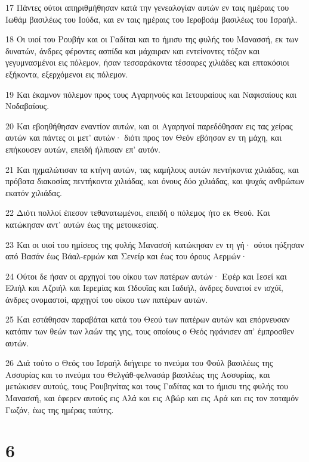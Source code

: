 \par 17 Πάντες ούτοι απηριθμήθησαν κατά την γενεαλογίαν αυτών εν ταις ημέραις του Ιωθάμ βασιλέως του Ιούδα, και εν ταις ημέραις του Ιεροβοάμ βασιλέως του Ισραήλ.
\par 18 Οι υιοί του Ρουβήν και οι Γαδίται και το ήμισυ της φυλής του Μανασσή, εκ των δυνατών, άνδρες φέροντες ασπίδα και μάχαιραν και εντείνοντες τόξον και γεγυμνασμένοι εις πόλεμον, ήσαν τεσσαράκοντα τέσσαρες χιλιάδες και επτακόσιοι εξήκοντα, εξερχόμενοι εις πόλεμον.
\par 19 Και έκαμνον πόλεμον προς τους Αγαρηνούς και Ιετουραίους και Ναφισαίους και Νοδαβαίους.
\par 20 Και εβοηθήθησαν εναντίον αυτών, και οι Αγαρηνοί παρεδόθησαν εις τας χείρας αυτών και πάντες οι μετ' αυτών· διότι προς τον Θεόν εβόησαν εν τη μάχη, και επήκουσεν αυτών, επειδή ήλπισαν επ' αυτόν.
\par 21 Και ηχμαλώτισαν τα κτήνη αυτών, τας καμήλους αυτών πεντήκοντα χιλιάδας, και πρόβατα διακοσίας πεντήκοντα χιλιάδας, και όνους δύο χιλιάδας, και ψυχάς ανθρώπων εκατόν χιλιάδας.
\par 22 Διότι πολλοί έπεσον τεθανατωμένοι, επειδή ο πόλεμος ήτο εκ Θεού. Και κατώκησαν αντ' αυτών έως της μετοικεσίας.
\par 23 Και οι υιοί του ημίσεος της φυλής Μανασσή κατώκησαν εν τη γή· ούτοι ηύξησαν από Βασάν έως Βάαλ-ερμών και Σενείρ και έως του όρους Αερμών·
\par 24 Ούτοι δε ήσαν οι αρχηγοί του οίκου των πατέρων αυτών· Εφέρ και Ιεσεί και Ελιήλ και Αζριήλ και Ιερεμίας και Ωδουΐας και Ιαδιήλ, άνδρες δυνατοί εν ισχύϊ, άνδρες ονομαστοί, αρχηγοί του οίκου των πατέρων αυτών.
\par 25 Και εστάθησαν παραβάται κατά του Θεού των πατέρων αυτών και επόρνευσαν κατόπιν των θεών των λαών της γης, τους οποίους ο Θεός ηφάνισεν απ' έμπροσθεν αυτών.
\par 26 Διά τούτο ο Θεός του Ισραήλ διήγειρε το πνεύμα του Φούλ βασιλέως της Ασσυρίας και το πνεύμα του Θελγάθ-φελνασάρ βασιλέως της Ασσυρίας, και μετώκισεν αυτούς, τους Ρουβηνίτας και τους Γαδίτας και το ήμισυ της φυλής του Μανασσή, και έφερεν αυτούς εις Αλά και εις Αβώρ και εις Αρά και εις τον ποταμόν Γωζάν, έως της ημέρας ταύτης.

\chapter{6}

